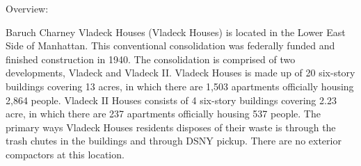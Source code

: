 Overview:

Baruch Charney Vladeck Houses (Vladeck Houses) is located in the Lower East Side of Manhattan. This conventional consolidation was federally funded and finished construction in 1940. The consolidation is comprised of two developments, Vladeck and Vladeck II. Vladeck Houses is made up of 20 six-story buildings covering 13 acres, in which there are 1,503 apartments officially housing 2,864 people. Vladeck II Houses consists of 4 six-story buildings covering 2.23 acre, in which there are 237 apartments officially housing 537 people. The primary ways Vladeck Houses residents disposes of their waste is through the trash chutes in the buildings and through DSNY pickup. There are no exterior compactors at this location. 